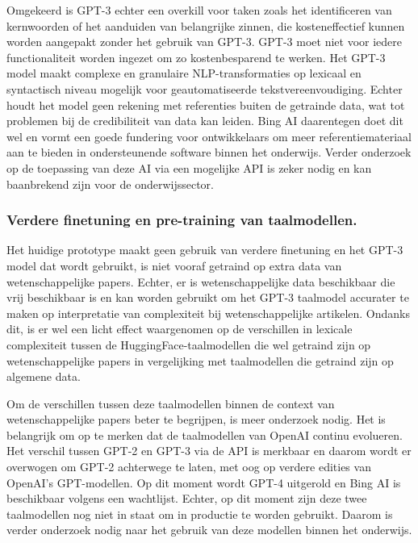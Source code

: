 \medskip

Omgekeerd is GPT-3 echter een overkill voor taken zoals het identificeren van kernwoorden of het aanduiden van belangrijke zinnen, die kosteneffectief kunnen worden aangepakt zonder het gebruik van GPT-3. GPT-3 moet niet voor iedere functionaliteit worden ingezet om zo kostenbesparend te werken. Het GPT-3 model maakt complexe en granulaire NLP-transformaties op lexicaal en syntactisch niveau mogelijk voor geautomatiseerde tekstvereenvoudiging. Echter houdt het model geen rekening met referenties buiten de getrainde data, wat tot problemen bij de credibiliteit van data kan leiden. Bing AI daarentegen doet dit wel en vormt een goede fundering voor ontwikkelaars om meer referentiemateriaal aan te bieden in ondersteunende software binnen het onderwijs. Verder onderzoek op de toepassing van deze AI via een mogelijke API is zeker nodig en kan baanbrekend zijn voor de onderwijssector. 

\subsubsection{Verdere finetuning en pre-training van taalmodellen.}

Het huidige prototype maakt geen gebruik van verdere finetuning en het GPT-3 model dat wordt gebruikt, is niet vooraf getraind op extra data van wetenschappelijke papers. Echter, er is wetenschappelijke data beschikbaar die vrij beschikbaar is en kan worden gebruikt om het GPT-3 taalmodel accurater te maken op interpretatie van complexiteit bij wetenschappelijke artikelen. Ondanks dit, is er wel een licht effect waargenomen op de verschillen in lexicale complexiteit tussen de HuggingFace-taalmodellen die wel getraind zijn op wetenschappelijke papers in vergelijking met taalmodellen die getraind zijn op algemene data. 

\medskip

Om de verschillen tussen deze taalmodellen binnen de context van wetenschappelijke papers beter te begrijpen, is meer onderzoek nodig. Het is belangrijk om op te merken dat de taalmodellen van OpenAI continu evolueren. Het verschil tussen GPT-2 en GPT-3 via de API is merkbaar en daarom wordt er overwogen om GPT-2 achterwege te laten, met oog op verdere edities van OpenAI's GPT-modellen. Op dit moment wordt GPT-4 uitgerold en Bing AI is beschikbaar volgens een wachtlijst. Echter, op dit moment zijn deze twee taalmodellen nog niet in staat om in productie te worden gebruikt. Daarom is verder onderzoek nodig naar het gebruik van deze modellen binnen het onderwijs.

